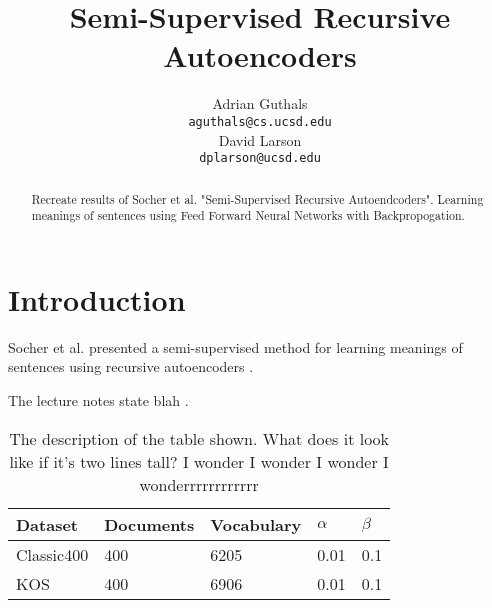 \documentclass{article}
\title{Semi-Supervised Recursive Autoencoders}
\author{
Adrian Guthals \\
\texttt{aguthals@cs.ucsd.edu} \\
\And
David Larson \\
\texttt{dplarson@ucsd.edu} \\
}
\newcommand{\ra}[1]{\renewcommand{\arraystretch}{#1}}
\begin{document}
\maketitle


\begin{abstract}
Recreate results of Socher et al. "Semi-Supervised Recursive Autoendcoders". Learning meanings of sentences using Feed Forward Neural Networks with Backpropogation.
\end{abstract}



\section{Introduction}

Socher et al. presented a semi-supervised method for learning meanings of sentences using recursive autoencoders \cite{Socher}.

The lecture notes state blah \cite{CSE250B}.


\begin{table}[ht]
    \centering

    \caption{The description of the table shown. What does it look like if it's two lines tall? I wonder I wonder I wonder I wonderrrrrrrrrrrr} 
    \label{tab:datasets}

    \ra{1.2}
    \begin{tabular}{@{} l l l l l @{}}
        \\
        \toprule
        \bf{Dataset} & \bf{Documents} & \bf{Vocabulary} & $\alpha$ & $\beta$ \\
        \midrule
        Classic400 & 400 & 6205 & 0.01 & 0.1 \\
        KOS        & 400 & 6906 & 0.01 & 0.1\\
        \bottomrule
    \end{tabular}
\end{table}




\small{


}
\end{document}
